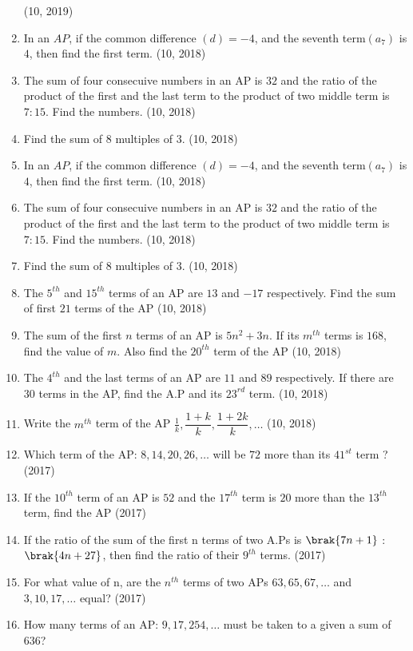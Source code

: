 \begin{enumerate}[label=\thesubsection.\arabic*,ref=\thesubsection.\theenumi,itemsep=1pt]
\hfill (10, 2019)
%
			 \item In an $AP$, if the common difference $(d) = -4$, and the seventh term$(a_7)$ is $4$, then find the first term.		
			\hfill (10, 2018) \item The sum of four consecuive numbers in an AP is $32$ and the ratio of the product of the first and the last term to the product of two middle term is $7:15$. Find the numbers.
	\hfill (10, 2018) \item Find the sum of $8$ multiples of $3$.
\hfill (10, 2018)
%
			 \item In an $AP$, if the common difference $(d) = -4$, and the seventh term$(a_7)$ is $4$, then find the first term.		
			\hfill (10, 2018) \item The sum of four consecuive numbers in an AP is $32$ and the ratio of the product of the first and the last term to the product of two middle term is $7:15$. Find the numbers.
%
	\hfill (10, 2018) \item Find the sum of $8$ multiples of $3$.
\hfill (10, 2018)
 \item The $5^{th}$ and $15^{th}$ terms of an AP are $13$ and $-17$ respectively. Find the sum of first $21$ terms of the AP
\hfill (10, 2018)
%
 \item The sum of the first $n$ terms of an AP is $5n^{2}+3n$. If its $m^{th}$ terms is $168$, find the value of $m$. Also find the $20^{th}$ term of the AP
\hfill (10, 2018) \item The $4^{th}$ and the last terms of an AP are $11$ and $89$ respectively. If there are $30$ terms in the AP, find the A.P and its $23^{rd}$ term.
\hfill (10, 2018) \item Write the $m^{th}$ term of the AP $\frac{1}{k},\dfrac{1+k}{k},\dfrac{1+2k}{k},\dots$
\hfill (10, 2018)
 \item Which term of the AP: $8,14,20,26,\dots$ will be $72$ more than its $41^{st}$ term ?
\hfill(2017) \item If the $10^{th}$ term of an AP is $52$ and the $17^{th}$ term is $20$ more than the $13^{th}$ term, find the AP
\hfill(2017) \item If the ratio of the sum of the first n terms of two A.Ps is $\brak{7n + 1}$ : $\brak{4n + 27}$, then find the ratio of their $9^{th}$ terms.
\hfill(2017) \item For what value of n, are the $n^{th}$ terms of two APs $63,65,67,\dots$ and $3,10, 17,\dots$ equal?
\hfill(2017) \item How many terms of an AP: $9,17,254,\dots$ must be taken to a given a sum of $636$?

\end{enumerate}

